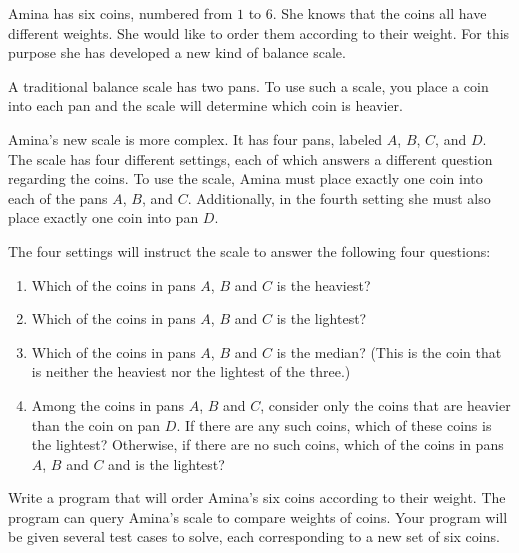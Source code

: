 Amina has six coins, numbered from $1$ to $6$. She knows that the coins all have different weights. She would like to order them according to their weight. For this purpose she has developed a new kind of balance scale.

A traditional balance scale has two pans. To use such a scale, you place a coin into each pan and the scale will determine which coin is heavier.

Amina's new scale is more complex. It has four pans, labeled $A$, $B$, $C$, and $D$. The scale has four different settings, each of which answers a different question regarding the coins. To use the scale, Amina must place exactly one coin into each of the pans $A$, $B$, and $C$. Additionally, in the fourth setting she must also place exactly one coin into pan $D$.

The four settings will instruct the scale to answer the following four questions:
\begin{enumerate}
\item Which of the coins in pans $A$, $B$ and $C$ is the heaviest?
\item Which of the coins in pans $A$, $B$ and $C$ is the lightest?
\item Which of the coins in pans $A$, $B$ and $C$ is the median? (This is the coin that is neither the heaviest nor the lightest of the three.)
\item Among the coins in pans $A$, $B$ and $C$, consider only the coins that are heavier than the coin on pan $D$. If there are any such coins, which of these coins is the lightest? Otherwise, if there are no such coins, which of the coins in pans $A$, $B$ and $C$ and is the lightest?
\end{enumerate}

Write a program that will order Amina's six coins according to their weight. The program can query Amina's scale to compare weights of coins. Your program will be given several test cases to solve, each corresponding to a new set of six coins.

